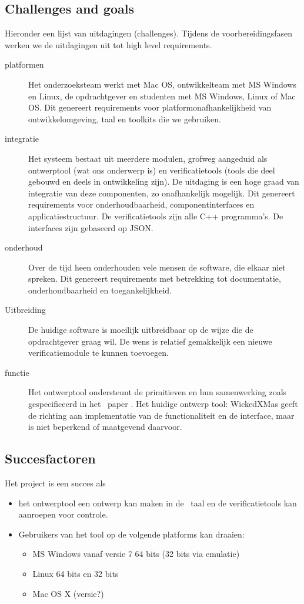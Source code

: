 \subsection{Challenges and goals}\label{sec: challenges goals}

Hieronder een lijst van uitdagingen (challenges). Tijdens de voorbereidingsfasen werken we de uitdagingen uit tot high level requirements.

\begin{description}
 \item[platformen] Het onderzoeksteam werkt met Mac OS, ontwikkelteam met MS Windows en Linux, de opdrachtgever en studenten met MS Windows, Linux of Mac OS.
		    Dit genereert requirements voor platformonafhankelijkheid van ontwikkelomgeving, taal en toolkits die we gebruiken.
 \item[integratie] Het systeem bestaat uit meerdere modulen, grofweg aangeduid als ontwerptool (wat ons onderwerp is) en verificatietools (tools die
		    deel gebouwd en deels in ontwikkeling zijn). De uitdaging is een hoge graad van integratie van deze componenten, zo onafhankelijk mogelijk.
		    Dit genereert requirements voor onderhoudbaarheid, componentinterfaces en applicatiestructuur. De verificatietools zijn alle C++ programma's.
		    De interfaces zijn gebaseerd op JSON.
 \item[onderhoud] Over de tijd heen onderhouden vele mensen de software, die elkaar niet spreken. Dit genereert requirements met betrekking tot documentatie,
		    onderhoudbaarheid en toegankelijkheid.
 \item[Uitbreiding] De huidige software is moeilijk uitbreidbaar op de wijze die de opdrachtgever graag wil. De wens is relatief gemakkelijk een nieuwe
		    verificatiemodule te kunnen toevoegen.
 \item[functie] Het ontwerptool ondersteunt de primitieven en hun samenwerking zoals gespecificeerd in het \xmas\ paper \cite{chatterjee-kishinevsky:xmas}.
		Het  huidige ontwerp tool: WickedXMas geeft de richting aan implementatie van de functionaliteit en de interface, maar is
		niet beperkend of maatgevend daarvoor.
\end{description}


\subsection{Succesfactoren}
Het project is een succes als

\begin{itemize}
 \item het ontwerptool een ontwerp kan maken in de \xmas\ taal en de verificatietools kan aanroepen voor controle.
 \item Gebruikers van het tool op de volgende platforms kan draaien:
 \begin{itemize}
    \item MS Windows vanaf versie 7 64 bits (32 bits via emulatie)
    \item Linux 64 bits en 32 bits
    \item Mac OS X (versie?)
 \end{itemize}
\end{itemize}

